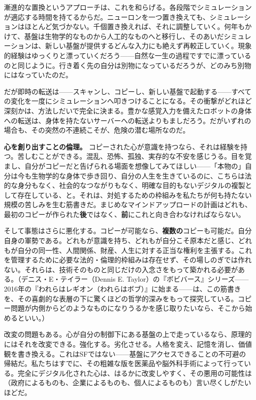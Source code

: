 \documentclass[11pt, twoside, openright]{book}
\begin{document}
漸進的な置換というアプローチは、これを和らげる。各段階でシミュレーションが適応する時間を持てるからだ。ニューロンを一つ置き換えても、シミュレーションはほとんど気づかない。千個置き換えれば、それに調整していく。何年もかけて、基盤は生物学的なものから人工的なものへと移行し、そのあいだシミュレーションは、新しい基盤が提供するどんな入力にも絶えず再較正していく。現象的経験はゆっくりと漂っていくだろう------自然な一生の過程ですでに漂っているのと同じように。行き着く先の自分は別物になっているだろうが、どのみち別物にはなっていたのだ。

だが即時の転送は------スキャンし、コピーし、新しい基盤で起動する------すべての変化を一度にシミュレーションへ叩きつけることになる。その衝撃がどれほど深刻かは、方法しだいで完全に決まる。豊かな感覚入力を備えたロボットの身体への転送は、身体を持たないサーバーへの転送よりもましだろう。だがいずれの場合も、その突然の不連続こそが、危険の潜む場所なのだ。

\textbf{心を創り出すことの倫理。} コピーされた心が意識を持つなら、それは経験を持つ。苦しむことができる。混乱、恐怖、孤独、実存的な不安を感じうる。目を覚まし、自分がコピーだと告げられる場面を想像してみてほしい------「本物の」自分は今も生物学的な身体で歩き回り、自分の人生を生きているのに、こちらは法的な身分もなく、社会的なつながりもなく、明確な目的もないデジタルの複製として存在している、と。それは、対処するための枠組みを私たちが何も持たない規模の苦しみを生む筋書きだ。まじめなマインドアップロードの計画はどれも、最初のコピーが作られた\textbf{後}ではなく、\textbf{前}にこれと向き合わなければならない。

そして事態はさらに悪化する。コピーが可能なら、\textbf{複数の}コピーも可能だ。自分自身の軍勢である。どれもが意識を持ち、どれもが自分こそ原本だと感じ、どれもが自分の同一性、人間関係、財産、人生に対する正当な権利を主張する。これを管理するために必要な法的・倫理的枠組みは存在せず、その場しのぎでは作れない。それらは、技術そのものと同じだけの入念さをもって築かれる必要がある。（デニス・E・テイラー（Dennis E. Taylor）の『ボビバース』シリーズ------2016年の『われらはレギオン（われらはボブ）』に始まる------は、この筋書きを、その喜劇的な表層の下に驚くほどの哲学的深みをもって探究している。コピー問題が内側からどのようなものになりうるかを感じ取りたいなら、そこから始めるといい。）

改変の問題もある。心が自分の制御下にある基盤の上で走っているなら、原理的にはそれを改変できる。強化する。劣化させる。人格を変え、記憶を消し、価値観を書き換える。これはSFではない------基盤にアクセスできることの不可避の帰結だ。私たちはすでに、その粗雑な版を医薬品や脳外科手術によって行っている。完全にデジタル化された心は、はるかに改変しやすく、その悪用の可能性は（政府によるものも、企業によるものも、個人によるものも）言い尽くしがたいほどだ。
\end{document}
